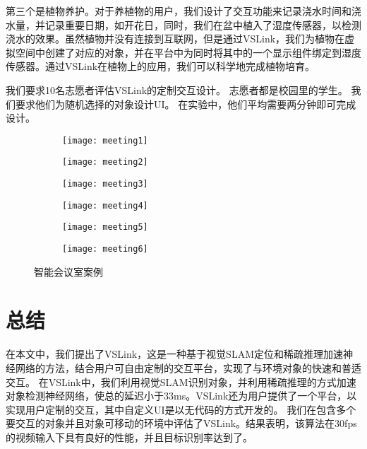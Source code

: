 第三个是植物养护。对于养植物的用户，我们设计了交互功能来记录浇水时间和浇水量，并记录重要日期，如开花日，同时，我们在盆中植入了湿度传感器，以检测浇水的效果。虽然植物并没有连接到互联网，但是通过VSLink，我们为植物在虚拟空间中创建了对应的对象，并在平台中为同时将其中的一个显示组件绑定到湿度传感器。通过VSLink在植物上的应用，我们可以科学地完成植物培育。

我们要求10名志愿者评估VSLink的定制交互设计。
志愿者都是校园里的学生。
我们要求他们为随机选择的对象设计UI。
在实验中，他们平均需要两分钟即可完成设计。



\begin{figure}[htbp]
	\centering
	\begin{subfigure}{.48\linewidth}
		\texttt{[image: meeting1]}
		\caption{}
	\end{subfigure}
	\quad
	\begin{subfigure}{.48\linewidth}
		\texttt{[image: meeting2]}
		\caption{}
	\end{subfigure}
	\quad
	\begin{subfigure}{.48\linewidth}
		\texttt{[image: meeting3]}
		\caption{}
	\end{subfigure}
	\quad
	\begin{subfigure}{.48\linewidth}
		\texttt{[image: meeting4]}
		\caption{}
	\end{subfigure}
	\quad
	\begin{subfigure}{.48\linewidth}
		\texttt{[image: meeting5]}
		\caption{}
	\end{subfigure}
	\quad
	\begin{subfigure}{.48\linewidth}
		\texttt{[image: meeting6]}
		\caption{}
	\end{subfigure}
	\caption{智能会议室案例}\label{fig:meeting}
\end{figure}



\chapter{总结}
\label{chap:sum}
在本文中，我们提出了VSLink，这是一种基于视觉SLAM定位和稀疏推理加速神经网络的方法，结合用户可自由定制的交互平台，实现了与环境对象的快速和普适交互。
在VSLink中，我们利用视觉SLAM识别对象，并利用稀疏推理的方式加速对象检测神经网络，使总的延迟小于33ms。VSLink还为用户提供了一个平台，以实现用户定制的交互，其中自定义UI是以无代码的方式开发的。
我们在包含多个要交互的对象并且对象可移动的环境中评估了VSLink。结果表明，该算法在30fps的视频输入下具有良好的性能，并且目标识别率达到了{\acc}。

